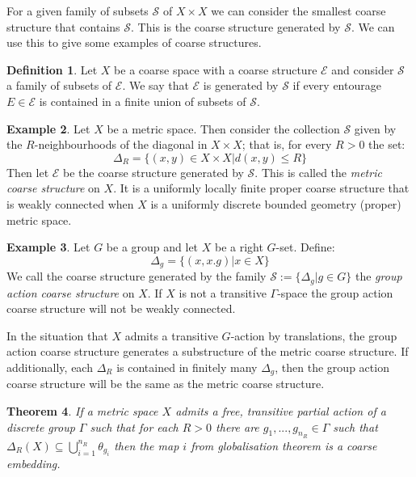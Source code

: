 \documentclass[11pt,a4paper]{amsart}
\theoremstyle{plain}
\newtheorem{theorem}{Theorem}%
\theoremstyle{definition}%
\newtheorem{definition}[theorem]{Definition}%
\newtheorem{example}[theorem]{Example}%
\theoremstyle{remark}%
\begin{document}
For a given family of subsets $\mathcal{S}$ of $X \times X$ we can consider the smallest coarse structure that contains $\mathcal{S}$. This is the coarse structure generated by $\mathcal{S}$. We can use this to give some examples of coarse structures.

\begin{definition}
Let $X$ be a coarse space with a coarse structure $\mathcal{E}$ and consider $\mathcal{S}$ a family of subsets of $\mathcal{E}$. We say that $\mathcal{E}$ is generated by $\mathcal{S}$ if every entourage $E \in \mathcal{E}$ is contained in a finite union of subsets of $\mathcal{S}$.
\end{definition}

\begin{example}\label{ex:MCS}
Let $X$ be a metric space. Then consider the collection $\mathcal{S}$ given by the $R$-neighbourhoods of the diagonal in $X\times X$; that is, for every $R>0$ the set:
\begin{equation*}
\Delta_{R}=\lbrace (x,y) \in X \times X | d(x,y)\leq R \rbrace
\end{equation*}
Then let $\mathcal{E}$ be the coarse structure generated by $\mathcal{S}$. This is called the \textit{metric coarse structure} on $X$. It is a uniformly locally finite proper coarse structure that is weakly connected when $X$ is a uniformly discrete bounded geometry (proper) metric space.
\end{example}

\begin{example}\label{ex:GACS}
Let $G$ be a group and let $X$ be a right $G$-set. Define:
\begin{equation*}
\Delta_{g}=\lbrace (x,x.g) | x \in X \rbrace  
\end{equation*}
We call the coarse structure generated by the family $\mathcal{S}:=\lbrace \Delta_{g} | g\in G\rbrace$ the \textit{group action coarse structure} on $X$. If $X$ is not a transitive $\Gamma$-space the group action coarse structure will not be weakly connected.
\end{example}

In the situation that $X$ admits a transitive $G$-action by translations, the group action coarse structure generates a substructure of the metric coarse structure. If additionally, each $\Delta_{R}$ is contained in finitely many $\Delta_{g}$, then the group action coarse structure will be the same as the metric coarse structure.

\begin{theorem}
If a metric space $X$ admits a free, transitive partial action of a discrete group $\Gamma$ such that for each $R>0$ there are $g_{1},...,g_{n_{R}} \in \Gamma$ such that $\Delta_{R}(X) \subseteq \bigcup_{i=1}^{n_{R}}\theta_{g_{i}}$ then the map $i$ from globalisation theorem is a coarse embedding.
\end{theorem}
\end{document}
